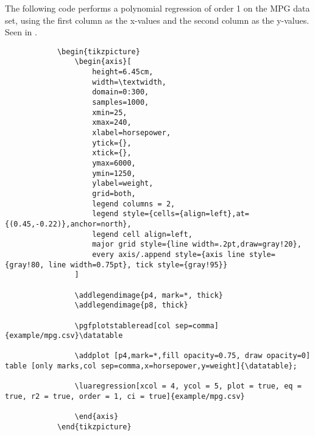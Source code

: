 \documentclass[11pt]{article}
\begin{document}
    The following code performs a polynomial regression of order 1 on the MPG data set, using the first column as the x-values and the second column as the y-values.
    Seen in .

	\begin{codebox}
	    \begin{verbatim}
	        \begin{tikzpicture}
	            \begin{axis}[
	                height=6.45cm,
	                width=\textwidth,
	                domain=0:300,
	                samples=1000,
	                xmin=25,
	                xmax=240,
	                xlabel=horsepower,
	                ytick={},
	                xtick={},
	                ymax=6000,
	                ymin=1250,
	                ylabel=weight,
	                grid=both,
	                legend columns = 2,
	                legend style={cells={align=left},at={(0.45,-0.22)},anchor=north},
	                legend cell align=left,
	                major grid style={line width=.2pt,draw=gray!20},
	                every axis/.append style={axis line style={gray!80, line width=0.75pt}, tick style={gray!95}}
	            ]
	
	            \addlegendimage{p4, mark=*, thick}
	            \addlegendimage{p8, thick}
	
	            \pgfplotstableread[col sep=comma]{example/mpg.csv}\datatable
	
	            \addplot [p4,mark=*,fill opacity=0.75, draw opacity=0] table [only marks,col sep=comma,x=horsepower,y=weight]{\datatable};
	
	            \luaregression[xcol = 4, ycol = 5, plot = true, eq = true, r2 = true, order = 1, ci = true]{example/mpg.csv}
	
	            \end{axis}
	        \end{tikzpicture}
	    \end{verbatim}
    \end{codebox}

    \pagebreak
\end{document}
